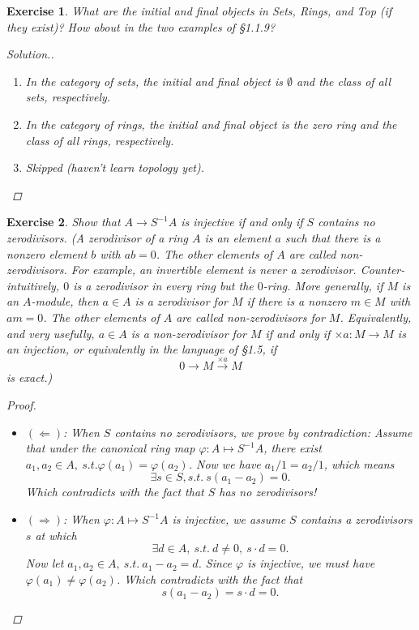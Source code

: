 \documentclass{article}
\theoremstyle{breakstyle}
\newtheorem{exercise}{Exercise}[section]
\newenvironment{solution}
  {\begin{proof}[Solution.]\renewcommand{\qedsymbol}{}}
  {\end{proof}}
\begin{document}
\begin{exercise}
What are the initial and final objects in Sets, Rings, and Top (if they
exist)? How about in the two examples of \S\emph{1.1.9}?

\begin{solution}
	\begin{enumerate}
        \item In the category of sets, the initial and final object is
            $\emptyset$ and the class of all sets, respectively.
        \item In the category of rings, the initial and final object is the zero
            ring and the class of all rings, respectively.
		\item \emph{Skipped (haven't learn topology yet).}
	\end{enumerate}
\end{solution}

\end{exercise}

\begin{exercise}
Show that $A \to S^{-1}A$ is injective if and only if $S$ contains no
zerodivisors. (A zerodivisor of a ring $A$ is an element $a$ such that there
is a nonzero element $b$ with $ab = 0$. The other elements of $A$ are called
non-zerodivisors. For example, an invertible element is never a zerodivisor.
Counter-intuitively, $0$ is a zerodivisor in every ring but the $0$-ring.
More generally, if $M$ is an $A$-module, then $a \in A$ is a zerodivisor for
$M$ if there is a nonzero $m \in M$ with $am = 0$. The other elements of $A$
are called non-zerodivisors for $M$. Equivalently, and very usefully,
$a \in A$ is a non-zerodivisor for $M$ if and only if $\times a: M \to M$ is
an injection, or equivalently in the language of \S\emph{1.5}, if
$$
0 \longrightarrow M \xrightarrow{\times a} M
$$
is exact.)

\begin{proof}
	\begin{itemize}
        \item $(\Leftarrow)$: When $S$ contains no zerodivisors, we prove by
            contradiction: Assume that under the canonical ring map
            $\varphi:A\mapsto S^{-1}A$, there exist $a_{1},a_{2}\in A,\
            s.t.\varphi(a_{1})=\varphi(a_{2})$. Now we have $a_{1}/1 = a_{2}/1$,
            which means
			$$
			\exists s \in S, s.t.\ s(a_{1}-a_{2})=0
			.$$ 
			Which contradicts with the fact that $S$ has no zerodivisors!
        \item $(\Rightarrow)$: When $\varphi:A \mapsto  S^{-1}A$ is injective,
            we assume $S$ contains a zerodivisors $s$ at which
			$$
			\exists d\in A,\ s.t.\ d\neq 0,\ s\cdot d=0
			.$$ 
            Now let $a_{1},a_{2}\in A,\ s.t.\ a_{1}-a_{2}=d$. Since $\varphi$ is
            injective,  we must have $\varphi(a_{1})\neq \varphi(a_{2})$. Which
            contradicts with the fact that
			$$
			s(a_{1}-a_{2})=s\cdot d = 0
			.$$ 
	\end{itemize}
\end{proof}

\end{exercise}
\end{document}
